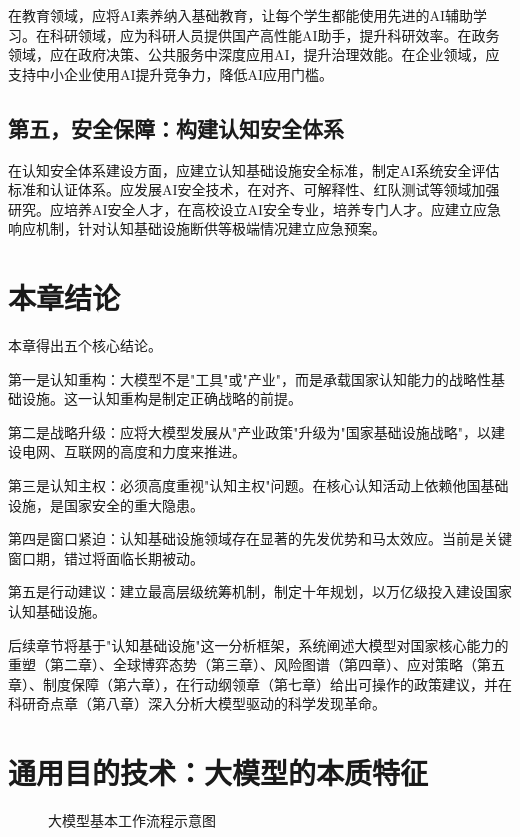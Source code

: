 在教育领域，应将AI素养纳入基础教育，让每个学生都能使用先进的AI辅助学习。在科研领域，应为科研人员提供国产高性能AI助手，提升科研效率。在政务领域，应在政府决策、公共服务中深度应用AI，提升治理效能。在企业领域，应支持中小企业使用AI提升竞争力，降低AI应用门槛。

\subsection{第五，安全保障：构建认知安全体系}

在认知安全体系建设方面，应建立认知基础设施安全标准，制定AI系统安全评估标准和认证体系。应发展AI安全技术，在对齐、可解释性、红队测试等领域加强研究。应培养AI安全人才，在高校设立AI安全专业，培养专门人才。应建立应急响应机制，针对认知基础设施断供等极端情况建立应急预案。

\section{本章结论}

本章得出五个核心结论。

第一是认知重构：大模型不是"工具"或"产业"，而是承载国家认知能力的战略性基础设施。这一认知重构是制定正确战略的前提。

第二是战略升级：应将大模型发展从"产业政策"升级为"国家基础设施战略"，以建设电网、互联网的高度和力度来推进。

第三是认知主权：必须高度重视"认知主权"问题。在核心认知活动上依赖他国基础设施，是国家安全的重大隐患。

第四是窗口紧迫：认知基础设施领域存在显著的先发优势和马太效应。当前是关键窗口期，错过将面临长期被动。

第五是行动建议：建立最高层级统筹机制，制定十年规划，以万亿级投入建设国家认知基础设施。

后续章节将基于"认知基础设施"这一分析框架，系统阐述大模型对国家核心能力的重塑（第二章）、全球博弈态势（第三章）、风险图谱（第四章）、应对策略（第五章）、制度保障（第六章），在行动纲领章（第七章）给出可操作的政策建议，并在科研奇点章（第八章）深入分析大模型驱动的科学发现革命。

\section{通用目的技术：大模型的本质特征}

\begin{figure}[htbp]
    \centering
    
    \caption{大模型基本工作流程示意图}
    \label{fig:llm_process}
\end{figure}


